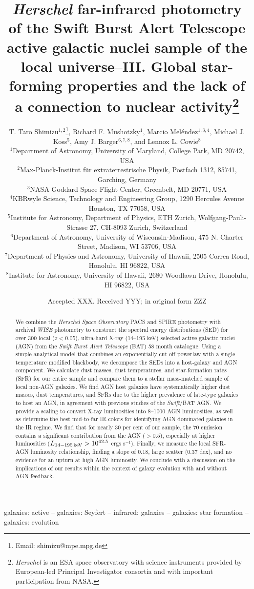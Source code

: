 \documentclass[fleqn, usenatbib]{mnras}
\title[\emph{Herschel}-BAT Sample: AGN-SF Connection]{\emph{Herschel} far-infrared photometry of the Swift Burst Alert
Telescope active galactic nuclei sample of the local universe--III. Global star-forming properties and the lack of a connection to nuclear activity\thanks{{\it Herschel} is an ESA space observatory with science instruments provided by European-led Principal Investigator consortia and with important participation from NASA.}}
\author[T. T. Shimizu]{T. Taro Shimizu$^{1,2}$\thanks{Email: shimizu@mpe.mpg.de}, Richard F. Mushotzky$^1$, Marcio Mel\'endez$^{1,3,4}$, Michael J. Koss$^{5}$, \newauthor Amy J. Barger$^{6,7,8}$, and Lennox L. Cowie$^{8}$\\
$^{1}$Department of Astronomy, University of Maryland, College Park, MD 20742, USA\\
$^{2}$Max-Planck-Institut f\"{u}r extraterrestrische Physik, Postfach 1312, 85741, Garching, Germany\\
$^{3}$NASA Goddard Space Flight Center,  Greenbelt, MD  20771, USA\\
$^{4}$KBRwyle Science, Technology and Engineering Group, 1290 Hercules Avenue  Houston, TX  77058, USA\\ 
$^{5}$Institute for Astronomy, Department of Physics, ETH Zurich, Wolfgang-Pauli-Strasse 27, CH-8093 Zurich, Switzerland\\
$^{6}$Department of Astronomy, University of Wisconsin-Madison, 475 N. Charter Street, Madison, WI 53706, USA\\
$^{7}$Department of Physics and Astronomy, University of Hawaii, 2505 Correa Road, Honolulu, HI 96822, USA\\
$^{8}$Institute for Astronomy, University of Hawaii, 2680 Woodlawn Drive, Honolulu, HI 96822, USA}
\date{Accepted XXX. Received YYY; in original form ZZZ}
\newcommand{\herschel}{\emph{Herschel}}
\newcommand{\swift}{\textit{Swift}}
\begin{document}
\label{firstpage}
\pagerange{\pageref{firstpage}--\pageref{lastpage}}
\maketitle

\begin{abstract}
We combine the \herschel{} \textit{Space Observatory} PACS and SPIRE photometry with archival \textit{WISE} photometry to construct the spectral energy distributions (SED) for over 300 local ($z < 0.05$), ultra-hard X-ray (14--195 keV) selected active galactic nuclei (AGN) from the \swift{} \textit{Burst Alert Telescope} (BAT) 58 month catalogue. Using a simple analytical model that combines an exponentially cut-off powerlaw with a single temperature modified blackbody, we decompose the SEDs into a host-galaxy and AGN component. We calculate dust masses, dust temperatures, and star-formation rates (SFR) for our entire sample and compare them to a stellar mass-matched sample of local non-AGN galaxies. We find AGN host galaxies have systematically higher dust masses, dust temperatures, and SFRs due to the higher prevalence of late-type galaxies to host an AGN, in agreement with previous studies of the \swift/BAT AGN. We provide a scaling to convert X-ray luminosities into 8--1000 \micron{} AGN luminosities, as well as determine the best mid-to-far IR colors for identifying AGN dominated galaxies in the IR regime. We find that for nearly 30 per cent of our sample, the 70 \micron{} emission contains a significant contribution from the AGN ($> 0.5$), especially at higher luminosities ($L_{14-195\,\rm{keV}} > 10^{42.5}$ ergs s$^{-1}$). Finally, we measure the local SFR-AGN luminosity relationship, finding a slope of 0.18, large scatter (0.37 dex), and no evidence for an upturn at high AGN luminosity. We conclude with a discussion on the implications of our results within the context of galaxy evolution with and without AGN feedback.
\end{abstract}

\begin{keywords}
galaxies: active -- galaxies: Seyfert -- infrared: galaxies -- galaxies: star formation -- galaxies: evolution 
\end{keywords}


\end{document}
